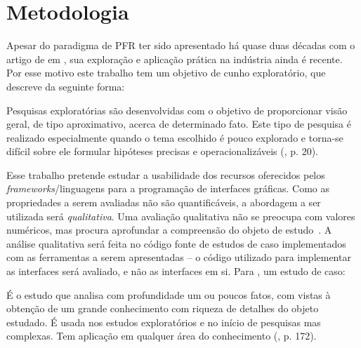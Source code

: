 \section{Metodologia}\label{lmetodologia}

Apesar do paradigma de PFR ter sido apresentado há
quase duas décadas com o artigo de 
em \citeyear{Elliott-H:1997:Fran}, sua exploração e aplicação
prática na indústria ainda é recente.
Por esse motivo este trabalho tem um objetivo de
cunho exploratório, que 
descreve da seguinte forma:

\begin{citacao}
  Pesquisas exploratórias são desenvolvidas com o
  objetivo de proporcionar visão geral, de tipo aproximativo,
  acerca de determinado fato.
  Este tipo de pesquisa é realizado especialmente quando o
  tema escolhido é pouco explorado e torna-se difícil sobre
  ele formular hipóteses precisas e operacionalizáveis
  (\citeyear{gil2010metodos}, p. 20).
\end{citacao}

Esse trabalho pretende estudar a usabilidade dos recursos
oferecidos pelos \emph{frameworks}/linguagens para a
programação de interfaces gráficas.
Como as propriedades a serem avaliadas não são quantificáveis,
a abordagem a ser utilizada será \emph{qualitativa}.
Uma avaliação qualitativa não se
preocupa com valores numéricos, mas procura aprofundar
a compreensão do objeto de estudo~\cite[p.~31]{gerhardt2009metodos}.
A análise qualitativa será feita no código fonte de estudos de caso
implementados com as ferramentas a serem apresentadas
-- o código utilizado para implementar as interfaces será
avaliado, e não as interfaces em si.
Para , um estudo de caso:

\begin{citacao}
  É o estudo que analisa com profundidade um ou poucos fatos,
  com vistas à obtenção de um grande conhecimento com riqueza
  de detalhes do objeto estudado. É usada nos estudos exploratórios
  e no início de pesquisas mas complexas. Tem aplicação em
  qualquer área do conhecimento (\citeyear{gil2010metodos}, p. 172).
\end{citacao}

